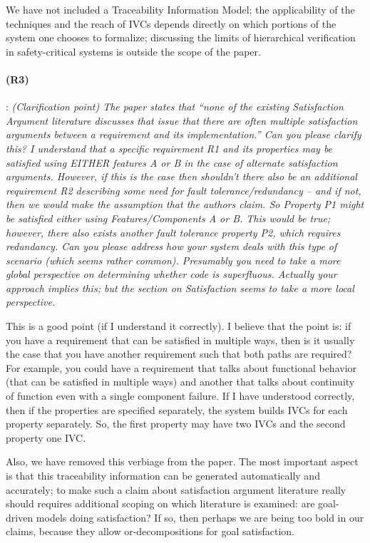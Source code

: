 \documentclass{article}
\begin{document}
We have not included a Traceability Information Model; the applicability of the techniques and the reach of IVCs depends directly on which portions of the system one chooses to formalize; discussing the limits of hierarchical verification in safety-critical systems is outside the scope of the paper.

\paragraph{(R3)}: 
\textit{(Clarification point) The paper states that ``none of the existing Satisfaction Argument literature discusses that issue that there are often multiple satisfaction arguments between a requirement and its implementation.'' Can you please clarify this? I understand that a specific requirement R1 and its properties may be satisfied using EITHER features A or B in the case of alternate satisfaction arguments. However, if this is the case then shouldn't there also be an additional requirement R2 describing some need for fault tolerance/redundancy -- and if not, then we would make the assumption that the authors claim. So Property P1 might be satisfied either using Features/Components A or B. This would be true; however, there also exists another fault tolerance property P2, which requires redundancy. Can you please address how your system deals with this type of scenario (which seems rather common). Presumably you need to take a more global perspective on determining whether code is superfluous. Actually your approach implies this; but the section on Satisfaction seems to take a more local perspective.}
\vspace{0.05in}

This is a good point (if I understand it correctly).  I believe that the point is: if you have a requirement that can be satisfied in multiple ways, then is it usually the case that you have another requirement such that both paths are required?  For example, you could have a requirement that talks about functional behavior (that can be satisfied in multiple ways) and another that talks about continuity of function even with a single component failure.  If I have understood correctly, then if the properties are specified separately, the system builds IVCs for each property separately.  So, the first property may have two IVCs and the second property one IVC.

Also, we have removed this verbiage from the paper.  The most important aspect is that this traceability information can be generated automatically and accurately; to make such a claim about satisfaction argument literature really should requires additional scoping on which literature is examined: are goal-driven models doing satisfaction?  If so, then perhaps we are being too bold in our claims, because they allow or-decompositions for goal satisfaction.
\end{document}
